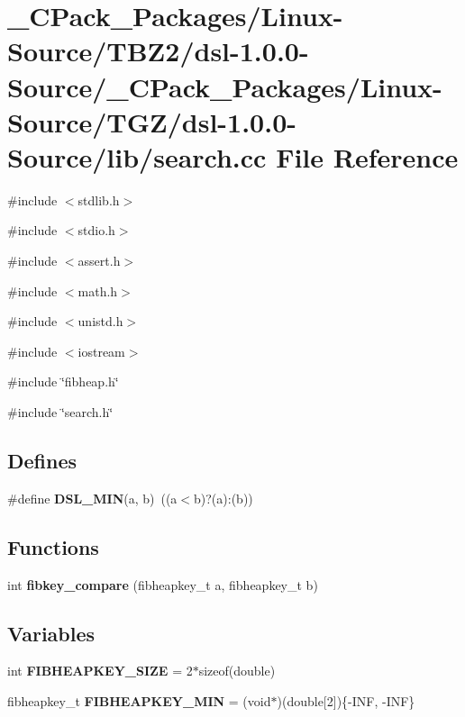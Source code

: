 \section{\_\-CPack\_\-Packages/Linux-\/Source/TBZ2/dsl-\/1.0.0-\/Source/\_\-CPack\_\-Packages/Linux-\/Source/TGZ/dsl-\/1.0.0-\/Source/lib/search.cc File Reference}
\label{__CPack__Packages_2Linux-Source_2TBZ2_2dsl-1_80_80-Source_2__CPack__Packages_2Linux-Source_2TGZ_2d09386ed110426644153f650bd3ba32}
{\ttfamily \#include $<$stdlib.h$>$}\par
{\ttfamily \#include $<$stdio.h$>$}\par
{\ttfamily \#include $<$assert.h$>$}\par
{\ttfamily \#include $<$math.h$>$}\par
{\ttfamily \#include $<$unistd.h$>$}\par
{\ttfamily \#include $<$iostream$>$}\par
{\ttfamily \#include \char`\"{}fibheap.h\char`\"{}}\par
{\ttfamily \#include \char`\"{}search.h\char`\"{}}\par
\subsection*{Defines}
\begin{DoxyCompactItemize}
\item 
\#define {\bf DSL\_\-MIN}(a, b)~((a$<$b)?(a):(b))
\end{DoxyCompactItemize}
\subsection*{Functions}
\begin{DoxyCompactItemize}
\item 
int {\bf fibkey\_\-compare} (fibheapkey\_\-t a, fibheapkey\_\-t b)
\end{DoxyCompactItemize}
\subsection*{Variables}
\begin{DoxyCompactItemize}
\item 
int {\bf FIBHEAPKEY\_\-SIZE} = 2$\ast$sizeof(double)
\item 
fibheapkey\_\-t {\bf FIBHEAPKEY\_\-MIN} = (void$\ast$)(double[2])\{-\/INF, -\/INF\}
\end{DoxyCompactItemize}


